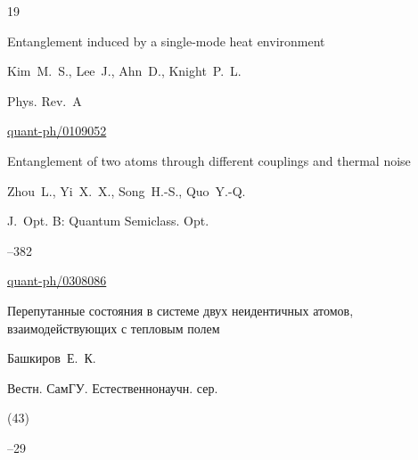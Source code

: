 \begin{thebibliography}{19}







\paper  Entanglement induced by a single-mode heat environment 

\by   Kim~M.~S.,  Lee~J.,  Ahn~D.,  Knight~P.~L.

\jour Phys.  Rev.~A






\arxiv \href{http://arxiv.org/abs/quant-ph/0109052}{quant-ph/0109052}




\paper  Entanglement of two atoms through different couplings and thermal noise 

\by  Zhou~L., Yi~X.~X., Song~H.-S., Quo~Y.-Q.

\jour J.~Opt. B: Quantum Semiclass. Opt. 




--382


\arxiv \href{http://arxiv.org/abs/quant-ph/0308086}{quant-ph/0308086}










\paper Перепутанные состояния в системе двух неидентичных атомов, взаимодействующих с тепловым полем

\by   Башкиров~Е.~К.

\jour Вестн. СамГУ. Естественнонаучн. сер.


(43) 

--29





\end{thebibliography}
